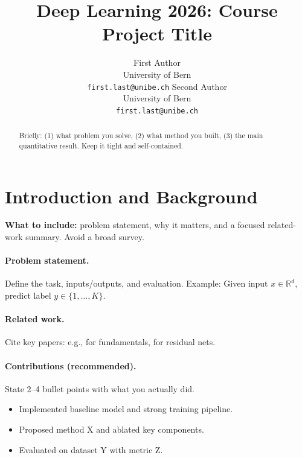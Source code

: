 \documentclass{article}
\title{Deep Learning 2026: Course Project Title}
\author{
  First Author \\
  University of Bern \\
  \texttt{first.last@unibe.ch}
  \And
  Second Author \\
  University of Bern \\
  \texttt{first.last@unibe.ch}
}
\begin{document}
\maketitle

\begin{abstract}
Briefly: (1) what problem you solve, (2) what method you built, (3) the main quantitative result.
Keep it tight and self-contained.
\end{abstract}

\vspace{0.5em}

\section{Introduction and Background}
\textbf{What to include:}
problem statement, why it matters, and a focused related-work summary.
Avoid a broad survey.

\paragraph{Problem statement.}
Define the task, inputs/outputs, and evaluation.
Example: Given input $x \in \mathbb{R}^{d}$, predict label $y \in \{1,\dots,K\}$.

\paragraph{Related work.}
Cite key papers: e.g., \citet{goodfellow2016deep} for fundamentals, \citet{he2016resnet} for residual nets.

\paragraph{Contributions (recommended).}
State 2--4 bullet points with what you actually did.
\begin{itemize}
  \item Implemented baseline model and strong training pipeline.
  \item Proposed method X and ablated key components.
  \item Evaluated on dataset Y with metric Z.
\end{itemize}
\end{document}
